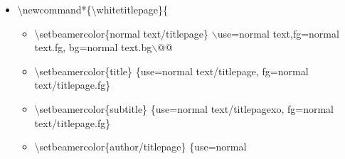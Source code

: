 \documentclass[presentation,t]{beamer}
\begin{document}
\begin{itemize}
\begin{itemize}
\item \textbackslash setbeamercolor\{headline/titlepage\} \{use=normal
     text/titlepage, fg=normal text/titlepage.fg\}%
\item \textbackslash setbeamercolor\{logo/titlepage\} \{use=normal
     text/titlepage, fg=normal text/titlepage.fg\}%
\item \textbackslash setbeamercolor\{einrichtung/titlepage\}
     \{use=normal text/titlepage, fg=normal text/titlepage.fg\}%
\item \textbackslash setbeamercolor\{fachrichtung/titlepage\}
     \{use=einrichtung/titlepage, fg=einrichtung/titlepage.fg\}%
\item \textbackslash setbeamercolor\{institut/titlepage\}
     \{use=einrichtung/titlepage, fg=einrichtung/titlepage.fg\}%
\item \textbackslash setbeamercolor\{professur/titlepage\}
     \{use=einrichtung/titlepage, fg=einrichtung/titlepage.fg\}%
\item \textbackslash setbeamercolor\{upper separation line
     head/titlepage\} \{use=normal text/titlepage, fg=normal text/titlepage.fg\}%
\item \textbackslash setbeamercolor\{lower separation line head/titlepage\}%
      \{use=upper separation line head/titlepage, fg=upper separation line head/titlepage.fg\}%
\item \textbackslash setbeamercolor\{date in head/foot/titlepage\}
     \{use=normal text/titlepage, fg=normal text/titlepage.fg\}%
\item \textbackslash let\textbackslash logo\@ DDC\textbackslash logo\@ DDC\@ white
\item \textbackslash let\textbackslash logo\@ DDCf\textbackslash logo\@ DDC\@ whitef
     \}
\end{itemize}
\item \textbackslash newcommand*\{\textbackslash whitetitlepage\}\{%
\begin{itemize}
\item \textbackslash setbeamercolor\{normal text/titlepage\}
$\backslash${use=normal text,fg=normal text.fg, bg=normal text.bg$\backslash$}@@
\item \textbackslash setbeamercolor\{title\} \{use=normal
    text/titlepage, fg=normal text/titlepage.fg\}%
\item \textbackslash setbeamercolor\{subtitle\} \{use=normal
     text/titlepagexo, fg=normal text/titlepage.fg\}%
\item \textbackslash setbeamercolor\{author/titlepage\} \{use=normal

\end{itemize}
\end{itemize}
\end{document}
